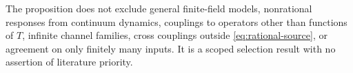 The proposition does not exclude general finite-field models,
nonrational responses from continuum dynamics, couplings to operators
other than functions of $T$, infinite channel families, cross couplings
outside \eqref{eq:rational-source}, or agreement on only finitely many
inputs. It is a scoped selection result with no assertion of
literature priority.
